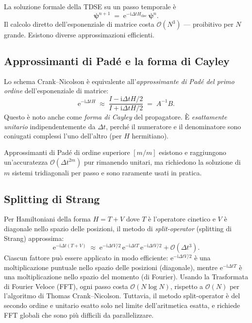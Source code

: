 \documentclass[12pt, a4paper]{article}
\newcommand{\dt}{\Delta t}
\newcommand{\ii}{\mathrm{i}}          %
\newcommand{\ee}{\mathrm{e}}          %
\newcommand{\CN}{Crank--Nicolson}
\begin{document}
La soluzione formale della TDSE su un passo temporale è
\begin{equation}
  \boldsymbol{\psi}^{n+1} \;=\;
  \ee^{-\ii\dt H_\text{disc}}\,\boldsymbol{\psi}^n.
\end{equation}
Il calcolo diretto dell'esponenziale di matrice costa $\mathcal{O}(N^3)$
— proibitivo per $N$ grande. Esistono diverse approssimazioni efficienti.

\subsection{Approssimanti di Padé e la forma di Cayley}

Lo schema \CN{} è equivalente all'\emph{approssimante di Padé del primo ordine}
dell'esponenziale di matrice:
\begin{equation}
  \ee^{-\ii\dt H} \;\approx\;
  \frac{I - \ii\dt H/2}{I + \ii\dt H/2}
  \;=\; A^{-1}B.
  \label{eq:cayley}
\end{equation}
Questo è noto anche come \emph{forma di Cayley} del propagatore. È
\emph{esattamente unitario} indipendentemente da $\dt$, perché il numeratore
e il denominatore sono coniugati complessi l'uno dell'altro (per $H$ hermitiano).

Approssimanti di Padé di ordine superiore $[m/m]$ esistono e raggiungono
un'accuratezza $\mathcal{O}(\dt^{2m})$ pur rimanendo unitari, ma richiedono
la soluzione di $m$ sistemi tridiagonali per passo e sono raramente usati
in pratica.

\subsection{Splitting di Strang}

Per Hamiltoniani della forma $H = T + V$ dove $T$ è l'operatore cinetico
e $V$ è diagonale nello spazio delle posizioni, il metodo di
\emph{split-operator} (splitting di Strang) approssima:
\begin{equation}
  \ee^{-\ii\dt(T+V)} \;\approx\;
  \ee^{-\ii\dt V/2}\,\ee^{-\ii\dt T}\,\ee^{-\ii\dt V/2}
  + \mathcal{O}(\dt^3).
\end{equation}
Ciascun fattore può essere applicato in modo efficiente: $\ee^{-\ii\dt V/2}$
è una moltiplicazione puntuale nello spazio delle posizioni (diagonale),
mentre $\ee^{-\ii\dt T}$ è una moltiplicazione nello spazio del momento
(di Fourier). Usando la Trasformata di Fourier Veloce (FFT), ogni passo
costa $\mathcal{O}(N\log N)$, rispetto a $\mathcal{O}(N)$ per l'algoritmo
di Thomas \CN{}. Tuttavia, il metodo split-operator è del secondo ordine
e unitario esatto solo nel limite dell'aritmetica esatta, e richiede FFT
globali che sono più difficili da parallelizzare.
\end{document}
